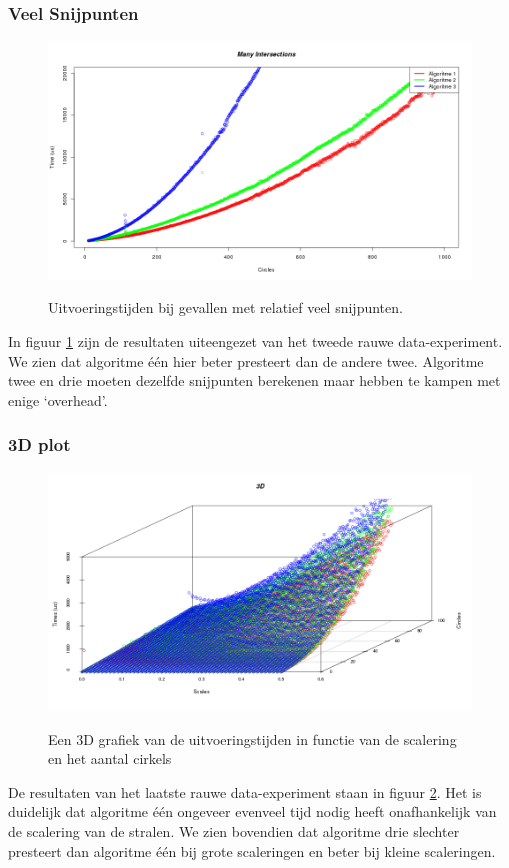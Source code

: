 \subsubsection{Veel Snijpunten}
\begin{figure}[H]
   	\centering
   	\includegraphics[width=\textwidth]{illustraties/manyIntersections.png}
   	\label{fig:many_intersections}
  	\caption{Uitvoeringstijden bij gevallen met relatief veel snijpunten.}
\end{figure}
In figuur \ref{fig:many_intersections} zijn de resultaten uiteengezet van het tweede rauwe data-experiment. We zien dat algoritme \'e\'en hier beter presteert dan de andere twee. Algoritme twee en drie moeten dezelfde snijpunten berekenen maar hebben te kampen met enige `overhead'.

\subsubsection{3D plot}
\begin{figure}[H]
   	\centering
   	\includegraphics[width=\textwidth]{illustraties/3DScatter.png}
	\label{fig:3d}
  	\caption{Een 3D grafiek van de uitvoeringstijden in functie van de scalering en het aantal cirkels}
\end{figure}
De resultaten van het laatste rauwe data-experiment staan in figuur \ref{fig:3d}.
Het is duidelijk dat algoritme \'e\'en ongeveer evenveel tijd nodig heeft onafhankelijk van de scalering van de stralen. We zien bovendien dat algoritme drie slechter presteert dan algoritme \'e\'en bij grote scaleringen en beter bij kleine scaleringen.

